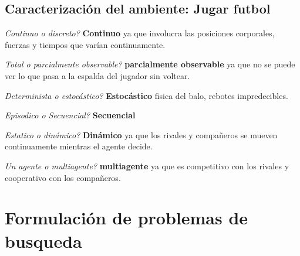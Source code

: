 \subsection{Caracterización del ambiente: Jugar futbol}

\textit{Continuo o discreto?} \textbf{Continuo} ya que involucra las posiciones corporales, fuerzas y tiempos que varían continuamente.

\textit{Total o parcialmente observable?} \textbf{parcialmente observable} ya que no se puede ver lo que pasa a la espalda del jugador sin voltear.

\textit{Determinista o estocástico?} \textbf{Estocástico} fisica del balo, rebotes impredecibles.

\textit{Episodico o Secuencial?} \textbf{Secuencial} 

\textit{Estatico o dinámico?} \textbf{Dinámico} ya que los rivales y compañeros se mueven continuamente mientras el agente decide.

\textit{Un agente o multiagente?} \textbf{multiagente} ya que es competitivo con los rivales y cooperativo con los compañeros.


\section{Formulación de problemas de busqueda}

